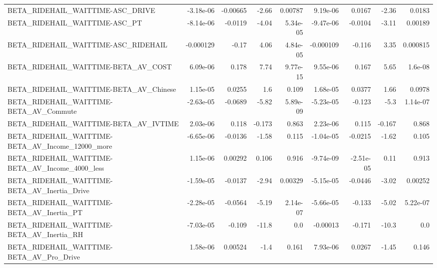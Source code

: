 \begin{tabular}{lrrrrrrrr}
BETA\_RIDEHAIL\_WAITTIME-ASC\_DRIVE                   &   -3.18e-06 &     -0.00665 &    -2.66 &  0.00787 &   9.19e-06 &      0.0167 &        -2.36 &        0.0183 \\
BETA\_RIDEHAIL\_WAITTIME-ASC\_PT                      &   -8.14e-06 &      -0.0119 &    -4.04 & 5.34e-05 &  -9.47e-06 &     -0.0104 &        -3.11 &       0.00189 \\
BETA\_RIDEHAIL\_WAITTIME-ASC\_RIDEHAIL                &   -0.000129 &        -0.17 &     4.06 & 4.84e-05 &  -0.000109 &      -0.116 &         3.35 &      0.000815 \\
BETA\_RIDEHAIL\_WAITTIME-BETA\_AV\_COST                &    6.09e-06 &        0.178 &     7.74 & 9.77e-15 &   9.55e-06 &       0.167 &         5.65 &       1.6e-08 \\
BETA\_RIDEHAIL\_WAITTIME-BETA\_AV\_Chinese             &    1.15e-05 &       0.0255 &      1.6 &    0.109 &   1.68e-05 &      0.0377 &         1.66 &        0.0978 \\
BETA\_RIDEHAIL\_WAITTIME-BETA\_AV\_Commute             &   -2.63e-05 &      -0.0689 &    -5.82 & 5.89e-09 &  -5.23e-05 &      -0.123 &         -5.3 &      1.14e-07 \\
BETA\_RIDEHAIL\_WAITTIME-BETA\_AV\_IVTIME              &    2.03e-06 &        0.118 &   -0.173 &    0.863 &   2.23e-06 &       0.115 &       -0.167 &         0.868 \\
BETA\_RIDEHAIL\_WAITTIME-BETA\_AV\_Income\_12000\_more   &   -6.65e-06 &      -0.0136 &    -1.58 &    0.115 &  -1.04e-05 &     -0.0215 &        -1.62 &         0.105 \\
BETA\_RIDEHAIL\_WAITTIME-BETA\_AV\_Income\_4000\_less    &    1.15e-06 &      0.00292 &    0.106 &    0.916 &  -9.74e-09 &   -2.51e-05 &         0.11 &         0.913 \\
BETA\_RIDEHAIL\_WAITTIME-BETA\_AV\_Inertia\_Drive       &   -1.59e-05 &      -0.0137 &    -2.94 &  0.00329 &  -5.15e-05 &     -0.0446 &        -3.02 &       0.00252 \\
BETA\_RIDEHAIL\_WAITTIME-BETA\_AV\_Inertia\_PT          &   -2.28e-05 &      -0.0564 &    -5.19 & 2.14e-07 &  -5.66e-05 &      -0.133 &        -5.02 &      5.22e-07 \\
BETA\_RIDEHAIL\_WAITTIME-BETA\_AV\_Inertia\_RH          &   -7.03e-05 &       -0.109 &    -11.8 &      0.0 &   -0.00013 &      -0.171 &        -10.3 &           0.0 \\
BETA\_RIDEHAIL\_WAITTIME-BETA\_AV\_Pro\_Drive           &    1.58e-06 &      0.00524 &     -1.4 &    0.161 &   7.93e-06 &      0.0267 &        -1.45 &         0.146 \\

\end{tabular}
